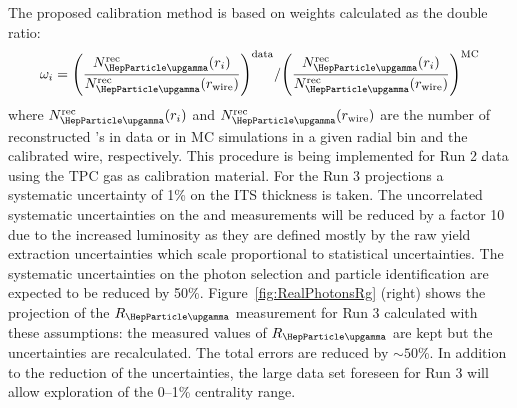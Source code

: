 The proposed calibration method is based on weights calculated 
as the double ratio: 
\begin{equation}
\omega_i= 
{\left(\frac{N_{\PGg}^{\rm rec}(r_i)}{N_{\PGg}^{\rm rec}(r_{\rm wire})}\right)^{\rm data}} /
{\left(\frac{N_{\PGg}^{\rm rec}(r_i)}{N_{\PGg}^{\rm rec}(r_{\rm wire})}\right)^{\rm MC}} 
\end{equation}
where $N_{\PGg}^{\rm rec}(r_i)$ and $N_{\PGg}^{\rm rec}(r_{\rm wire})$ are the number of reconstructed \PGg 's in data or in MC simulations in a given radial bin and the calibrated wire, respectively.
This procedure is being implemented for Run 2 data using the TPC gas as calibration material. For the Run 3 projections a systematic uncertainty of 1\% on the ITS thickness is taken. The uncorrelated systematic uncertainties on the \PGpz and \PGh measurements will be reduced by a factor 10 due to the increased luminosity as they are defined mostly by the raw yield extraction uncertainties which scale proportional to statistical uncertainties. 
The systematic uncertainties on the photon selection and particle identification are expected to be reduced by 50\%.
Figure~\ref{fig:RealPhotonsRg} (right) shows the projection of the $R_{\PGg}$ measurement 
for Run 3 calculated with these assumptions: the measured values of $R_{\PGg}$ are kept but the uncertainties are recalculated. The total errors are reduced by $\sim50$\%. In addition to the reduction of the uncertainties, the large data set foreseen for Run 3 will allow exploration of the 0--1\% centrality range. 




